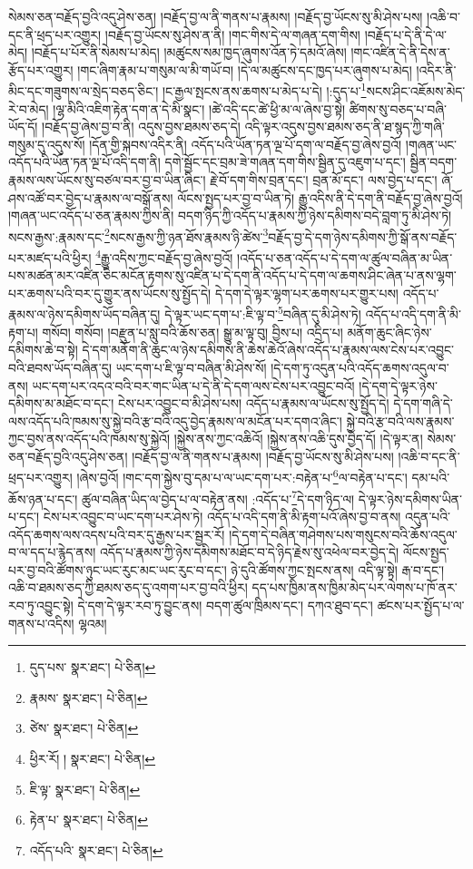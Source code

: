 སེམས་ཅན་བརྗོད་བྱའི་འདུ་ཤེས་ཅན། །བརྗོད་བྱ་ལ་ནི་གནས་པ་རྣམས། །བརྗོད་བྱ་ཡོངས་སུ་མི་ཤེས་པས། །འཆི་བ་དང་ནི་ཕྲད་པར་འགྱུར། །བརྗོད་བྱ་ཡོངས་སུ་ཤེས་ན་ནི། །གང་གིས་དེ་ལ་གཞན་དག་གིས། །བརྗོད་པ་དེ་ནི་དེ་ལ་མེད། །བརྗོད་པ་པོར་ནི་སེམས་པ་མེད། །མཚུངས་སམ་ཁྱད་ཞུགས་འོན་ཏེ་དམའོ་ཞེས། །གང་འཛིན་དེ་ནི་དེས་ན་རྩོད་པར་འགྱུར། །གང་ཞིག་རྣམ་པ་གསུམ་ལ་མི་གཡོ་བ། །དེ་ལ་མཚུངས་དང་ཁྱད་པར་ཞུགས་པ་མེད། །འདིར་ནི་མིང་དང་གཟུགས་ལ་སྲེད་བཅད་ཅིང་། །ང་རྒྱལ་སྤངས་ནས་ཆགས་པ་མེད་པ་དེ། །:དུད་པ་\footnote{དུད་པས་  སྣར་ཐང་།  པེ་ཅིན། }སངས་ཤིང་འཇོམས་མེད་རེ་བ་མེད། །ལྷ་མིའི་འཇིག་རྟེན་དག་ན་དེ་མི་སྣང་། །ཚེ་འདི་དང་ཚེ་ཕྱི་མ་ལ་ཞེས་བྱ་སྟེ། ཚིགས་སུ་བཅད་པ་བཞི་ཡོད་དོ། །བརྗོད་བྱ་ཞེས་བྱ་བ་ནི། འདུས་བྱས་ཐམས་ཅད་དེ། འདི་ལྟར་འདུས་བྱས་ཐམས་ཅད་ནི་ཐ་སྙད་ཀྱི་གཞི་གསུམ་དུ་འདུས་སོ། །དོན་གྱི་སྐབས་འདིར་ནི། འདོད་པའི་ཡོན་ཏན་ལྔ་པོ་དག་ལ་བརྗོད་བྱ་ཞེས་བྱའོ། །གཞན་ཡང་འདོད་པའི་ཡོན་ཏན་ལྔ་པོ་འདི་དག་ནི། དགེ་སྦྱོང་དང་བྲམ་ཟེ་གཞན་དག་གིས་སྦྱིན་དུ་འཇུག་པ་དང་། སྦྱིན་བདག་རྣམས་ལས་ཡོངས་སུ་བཙལ་བར་བྱ་བ་ཡིན་ཞིང་། རྗེ་བོ་དག་གིས་བྲན་དང་། བྲན་མོ་དང་། ལས་བྱེད་པ་དང་། ཞོ་ཤས་འཚོ་བར་བྱེད་པ་རྣམས་ལ་བསྒོ་ནས། ལོངས་སྤྱད་པར་བྱ་བ་ཡིན་ཏེ། རྒྱུ་འདིས་ནི་དེ་དག་ནི་བརྗོད་བྱ་ཞེས་བྱའོ། །གཞན་ཡང་འདོད་པ་ཅན་རྣམས་ཀྱིས་ནི། བདག་ཉིད་ཀྱི་འདོད་པ་རྣམས་ཀྱི་ཉེས་དམིགས་བདེ་བླག་ཏུ་མི་ཤེས་ཏེ། སངས་རྒྱས་:རྣམས་དང་\footnote{རྣམས་  སྣར་ཐང་།  པེ་ཅིན། }སངས་རྒྱས་ཀྱི་ཉན་ཐོས་རྣམས་ཉི་ཚེས་\footnote{ཙེས་  སྣར་ཐང་།  པེ་ཅིན། }བརྗོད་བྱ་དེ་དག་ཉེས་དམིགས་ཀྱི་སྒོ་ནས་བརྗོད་པར་མཛད་པའི་ཕྱིར། \footnote{ཕྱིར་རོ། །   སྣར་ཐང་།  པེ་ཅིན། }རྒྱུ་འདིས་ཀྱང་བརྗོད་བྱ་ཞེས་བྱའོ། །འདོད་པ་ཅན་འདོད་པ་དེ་དག་ལ་ཚུལ་བཞིན་མ་ཡིན་པས་མཚན་མར་འཛིན་ཅིང་མངོན་རྟགས་སུ་འཛིན་པ་དེ་དག་ནི་འདོད་པ་དེ་དག་ལ་ཆགས་ཤིང་ཞེན་པ་ནས་ལྷག་པར་ཆགས་པའི་བར་དུ་གྱུར་ནས་ཡོངས་སུ་སྤྱོད་དེ། དེ་དག་དེ་ལྟར་ལྷག་པར་ཆགས་པར་གྱུར་པས། འདོད་པ་རྣམས་ལ་ཉེས་དམིགས་ཡོད་བཞིན་དུ། དེ་ལྟར་ཡང་དག་པ་:ཇི་ལྟ་བ་\footnote{ཇི་ལྟ་  སྣར་ཐང་།  པེ་ཅིན། }བཞིན་དུ་མི་ཤེས་ཏེ། འདོད་པ་འདི་དག་ནི་མི་རྟག་པ། གསོབ། གསོབ། །བརྫུན་པ་སླུ་བའི་ཆོས་ཅན། སྒྱུ་མ་ལྟ་བུ། བྱིས་པ། འདྲིད་པ། མནོག་ཆུང་ཞིང་ཉེས་དམིགས་ཆེ་བ་སྟེ། དེ་དག་མནོག་ནི་ཆུང་ལ་ཉེས་དམིགས་ནི་ཆེས་ཆེའོ་ཞེས་འདོད་པ་རྣམས་ལས་ངེས་པར་འབྱུང་བའི་ཐབས་ཡོད་བཞིན་དུ། ཡང་དག་པ་ཇི་ལྟ་བ་བཞིན་མི་ཤེས་སོ། །དེ་དག་ཏུ་འདུན་པའི་འདོད་ཆགས་འདུལ་བ་ནས། ཡང་དག་པར་འདའ་བའི་བར་གང་ཡིན་པ་དེ་ནི་དེ་དག་ལས་ངེས་པར་འབྱུང་བའོ། །དེ་དག་དེ་ལྟར་ཉེས་དམིགས་མ་མཐོང་བ་དང་། ངེས་པར་འབྱུང་བ་མི་ཤེས་པས། འདོད་པ་རྣམས་ལ་ཡོངས་སུ་སྤྱོད་དེ། དེ་དག་གཞི་དེ་ལས་འདོད་པའི་ཁམས་སུ་སྐྱེ་བའི་རྩ་བའི་འདུ་བྱེད་རྣམས་ལ་མངོན་པར་དགའ་ཞིང་། སྐྱེ་བའི་རྩ་བའི་ལས་རྣམས་ཀྱང་བྱས་ནས་འདོད་པའི་ཁམས་སུ་སྐྱེའོ། །སྐྱེས་ནས་ཀྱང་འཆིའོ། །སྐྱེས་ནས་འཆི་དུས་བྱེད་དོ། །དེ་ལྟར་ན། སེམས་ཅན་བརྗོད་བྱའི་འདུ་ཤེས་ཅན། །བརྗོད་བྱ་ལ་ནི་གནས་པ་རྣམས། །བརྗོད་བྱ་ཡོངས་སུ་མི་ཤེས་པས། །འཆི་བ་དང་ནི་ཕྲད་པར་འགྱུར། །ཞེས་བྱའོ། །གང་དག་སྐྱེས་བུ་དམ་པ་ལ་ཡང་དག་པར་:བརྟེན་པ་\footnote{རྟེན་པ་  སྣར་ཐང་།  པེ་ཅིན། }ལ་བརྟེན་པ་དང་། དམ་པའི་ཆོས་ཉན་པ་དང་། ཚུལ་བཞིན་ཡིད་ལ་བྱེད་པ་ལ་བརྟེན་ནས། :འདོད་པ་\footnote{འདོད་པའི་  སྣར་ཐང་།  པེ་ཅིན། }དེ་དག་ཉིད་ལ། དེ་ལྟར་ཉེས་དམིགས་ཡིན་པ་དང་། ངེས་པར་འབྱུང་བ་ཡང་དག་པར་ཤེས་ཏེ། འདོད་པ་འདི་དག་ནི་མི་རྟག་པའོ་ཞེས་བྱ་བ་ནས། འདུན་པའི་འདོད་ཆགས་ལས་འདས་པའི་བར་དུ་རྒྱས་པར་སྦྱར་རོ། །དེ་དག་དེ་བཞིན་གཤེགས་པས་གསུངས་བའི་ཆོས་འདུལ་བ་ལ་དད་པ་རྙེད་ནས། འདོད་པ་རྣམས་ཀྱི་ཉེས་དམིགས་མཐོང་བ་དེ་ཉིད་རྗེས་སུ་འཕེལ་བར་བྱེད་དེ། ལོངས་སྤྱད་པར་བྱ་བའི་ཚོགས་ཉུང་ཡང་རུང་མང་ཡང་རུང་བ་དང་། ཉེ་དུའི་ཚོགས་ཀྱང་སྤངས་ནས། འདི་ལྟ་སྟེ། རྒ་བ་དང་། འཆི་བ་ཐམས་ཅད་ཀྱི་ཐམས་ཅད་དུ་འགག་པར་བྱ་བའི་ཕྱིར། དད་པས་ཁྱིམ་ནས་ཁྱིམ་མེད་པར་ལེགས་པ་ཁོ་ནར་རབ་ཏུ་འབྱུང་སྟེ། དེ་དག་དེ་ལྟར་རབ་ཏུ་བྱུང་ནས། བདག་ཚུལ་ཁྲིམས་དང་། དཀའ་ཐུབ་དང་། ཚངས་པར་སྤྱོད་པ་ལ་གནས་པ་འདིས། ལྷའམ། 